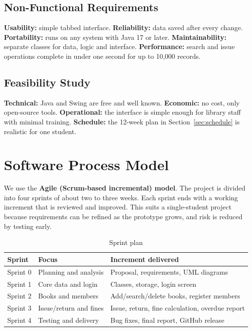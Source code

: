 \documentclass[12pt,a4paper]{article}
\begin{document}
\subsection{Non-Functional Requirements}
\textbf{Usability:} simple tabbed interface. \textbf{Reliability:} data saved after every change. \textbf{Portability:} runs on any system with Java 17 or later. \textbf{Maintainability:} separate classes for data, logic and interface. \textbf{Performance:} search and issue operations complete in under one second for up to 10{,}000 records.

\subsection{Feasibility Study}
\textbf{Technical:} Java and Swing are free and well known. \textbf{Economic:} no cost, only open-source tools. \textbf{Operational:} the interface is simple enough for library staff with minimal training. \textbf{Schedule:} the 12-week plan in Section~\ref{sec:schedule} is realistic for one student.

\section{Software Process Model}
We use the \textbf{Agile (Scrum-based incremental) model}. The project is divided into four sprints of about two to three weeks. Each sprint ends with a working increment that is reviewed and improved. This suits a single-student project because requirements can be refined as the prototype grows, and risk is reduced by testing early.

\begin{table}[H]\centering\begin{tabular}{@{}lll@{}}\toprule Sprint & Focus & Increment delivered \\ \midrule
Sprint 0 & Planning and analysis & Proposal, requirements, UML diagrams \\
Sprint 1 & Core data and login & Classes, storage, login screen \\
Sprint 2 & Books and members & Add/search/delete books, register members \\
Sprint 3 & Issue/return and fines & Issue, return, fine calculation, overdue report \\
Sprint 4 & Testing and delivery & Bug fixes, final report, GitHub release \\ \bottomrule\end{tabular}\caption{Sprint plan}\end{table}
\end{document}

